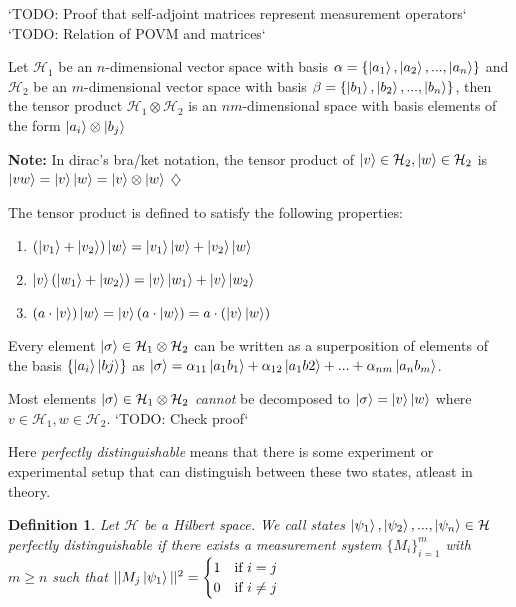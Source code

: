\documentclass[12pt,twoside,fleqn]{report}
\theoremstyle{thmstyle}
\newtheorem{defn}{Definition}[chapter]
\newenvironment{note}{\textbf{Note:}}{\hfill\ensuremath{\diamondsuit}}
\begin{document}
`TODO: Proof that self-adjoint matrices represent measurement operators`
`TODO: Relation of POVM and matrices`

Let $\mathcal{H}_1$ be an $n$-dimensional vector space with basis $\alpha = \{ \ket{a_1}, \ket{a_2}, ..., \ket{a_n} \}$ and $\mathcal{H}_2$ be an $m$-dimensional vector space with basis $\beta = \{ \ket{b_1}, \ket{b_2}, ..., \ket{b_n} \}$, then the tensor product $\mathcal{H}_1 \otimes \mathcal{H}_2$ is an $nm$-dimensional space with basis elements of the form $\ket{a_i} \otimes \ket{b_j}$

\begin{note}
    In dirac's bra/ket notation, the tensor product of $\ket{v} \in \mathcal{H}_2, \ket{w} \in \mathcal{H}_2$ is $\ket{vw} = \ket{v}\ket{w} = \ket{v} \otimes \ket{w}$
\end{note}

The tensor product is defined to satisfy the following properties:
\begin{enumerate}
    \item $(\ket{v_1} + \ket{v_2} ) \ket{w} = \ket{v_1}\ket{w} + \ket{v_2}\ket{w}$
    \item $\ket{v}(\ket{w_1} + \ket{w_2}) =  \ket{v}\ket{w_1} + \ket{v}\ket{w_2}$
    \item $(a \cdot \ket{v})\ket{w} = \ket{v}(a \cdot \ket{w})  = a \cdot (\ket{v}\ket{w})$
\end{enumerate}
Every element $\ket{\sigma} \in \mathcal{H}_1 \otimes \mathcal{H}_2$ can be written as a superposition of elements of the basis $\{ \ket{a_i}\ket{bj} \}$ as $\ket{\sigma} = \alpha_{11} \ket{a_1 b_1} + \alpha_{12} \ket{a_1 b2} + ... + \alpha_{nm} \ket{a_n b_m}$.

Most elements $\ket{\sigma} \in \mathcal{H}_1 \otimes \mathcal{H}_2$ \textit{cannot} be decomposed to $\ket{\sigma} = \ket{v}\ket{w}$ where $v \in \mathcal{H}_1, w \in \mathcal{H}_2$.
`TODO: Check proof`

Here \textit{perfectly distinguishable} means that there is some experiment or experimental setup that can distinguish between these two states, atleast in theory.

\begin{defn}
            Let $\mathcal{H}$ be a Hilbert space. We call states $\ket{\psi_1}, \ket{\psi_2}, ..., \ket{\psi_n} \in \mathcal{H}$ perfectly distinguishable if there exists a measurement system $\{ M_i \}_{i=1}^m$ with $m \geq n$ such that $|| M_j \ket{\psi_1} ||^2 = \begin{cases} 1 & \text{if } i = j \\ 0 & \text{if } i \neq j \end{cases}$
\end{defn}
\end{document}
